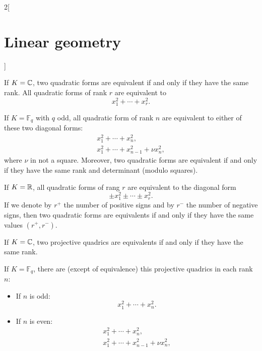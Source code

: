 \documentclass[../../../main.tex]{subfiles}
\begin{document}
\begin{multicols}{2}[\section{Linear geometry}]
\begin{prop}
    \end{prop}
    \begin{theorem}
        If $K=\mathbb{C} $, two quadratic forms are equivalent if and only if they have the same rank. All quadratic forms of rank $r$ are equivalent to $$x_1^2+\cdots+x_r^2.$$
    \end{theorem}
    \begin{theorem}
        If $K=\mathbb{F}_q$ with $q$ odd, all quadratic form
        of rank $n$ are equivalent to either of these two diagonal forms:
        \begin{gather*}
            x_1^2+\cdots+ x_n^2,\\
            x_1^2+\cdots+ x_{n-1}^2+\nu x_n^2,
        \end{gather*}
        where $\nu$ in not a square. Moreover, two quadratic forms are equivalent if and only if they have the same rank and determinant (modulo squares).
    \end{theorem}
    \begin{theorem}
        If $K=\mathbb{R} $, all quadratic forms
        of rang $r$ are equivalent to the diagonal form
        $$\pm x_1^2\pm\cdots\pm x_r^2.$$ If we denote by $r^+$ the number of positive signs and by $r^-$ the number of negative signs, then two quadratic forms are equivalents if and only if they have the same values $(r^+,r^-)$.
    \end{theorem}
    \begin{theorem}
        If $K=\mathbb{C} $, two projective quadrics are equivalents if and only if they have the same rank.
    \end{theorem}
    \begin{theorem}
        If $K=\mathbb{F}_q$, there are (except of equivalence) this projective quadrics in each rank $n$:
        \begin{itemize}
            \item If $n$ is odd: $$\displaystyle x_1^2+\cdots+ x_n^2.$$
            \item If $n$ is even: \begin{gather*}
                      x_1^2+\cdots+ x_n^2,\\
                      x_1^2+\cdots+ x_{n-1}^2+\nu x_n^2,
                  \end{gather*}

\end{itemize}
\end{theorem}
\end{multicols}
\end{document}
